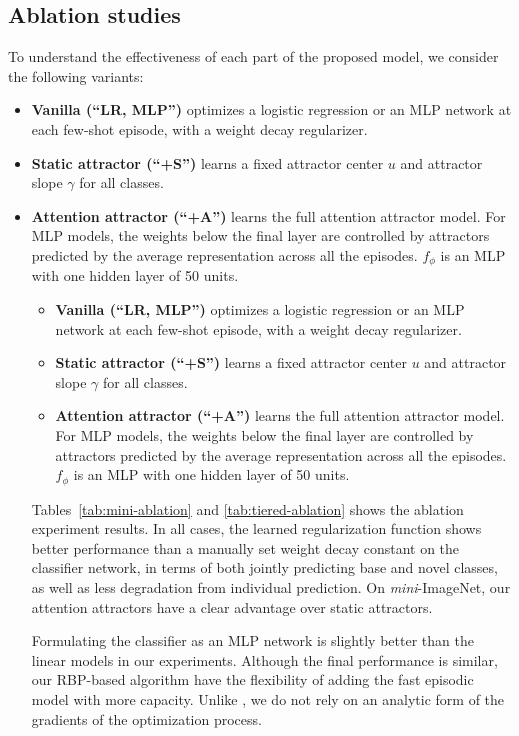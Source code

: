 \subsection{Ablation studies}
To understand the effectiveness of each part of the proposed model, we consider the following
variants:
\iflatexml
\begin{itemize}
\item \textbf{Vanilla (``LR, MLP'')} optimizes a logistic regression or an MLP network at each
few-shot episode, with a weight decay regularizer.
\item \textbf{Static attractor (``+S'')} learns a fixed attractor center $u$ and attractor
slope $\gamma$ for all classes. 
\item \textbf{Attention attractor (``+A'')} learns the full attention attractor model.
For MLP models, the weights below the final layer are controlled by attractors predicted
by the average representation across all the episodes. $f_\phi$ is an MLP with one hidden layer of
50 units.
\else
\begin{itemize}[leftmargin=*]
\item \textbf{Vanilla (``LR, MLP'')} optimizes a logistic regression or an MLP network at each
few-shot episode, with a weight decay regularizer.
\item \textbf{Static attractor (``+S'')} learns a fixed attractor center $u$ and attractor
slope $\gamma$ for all classes. 
\item \textbf{Attention attractor (``+A'')} learns the full attention attractor model.
For MLP models, the weights below the final layer are controlled by attractors predicted
by the average representation across all the episodes. $f_\phi$ is an MLP with one hidden layer of
50 units.
\fi
\end{itemize}
Tables~\ref{tab:mini-ablation} and \ref{tab:tiered-ablation} shows the ablation experiment results.
In all cases, the learned regularization function shows better performance than a manually set
weight decay constant on the classifier network, in terms of both jointly predicting base and novel
classes, as well as less degradation from individual prediction. On \textit{mini}-ImageNet, our
attention attractors have a clear advantage over static attractors.

Formulating the classifier as an MLP network is slightly better than the linear models in our
experiments. Although the final performance is similar, our RBP-based algorithm have the flexibility
of adding the fast episodic model with more capacity. Unlike \citet{diffsolver}, we do not rely on an
analytic form of the gradients of the optimization process.


\end{itemize}
